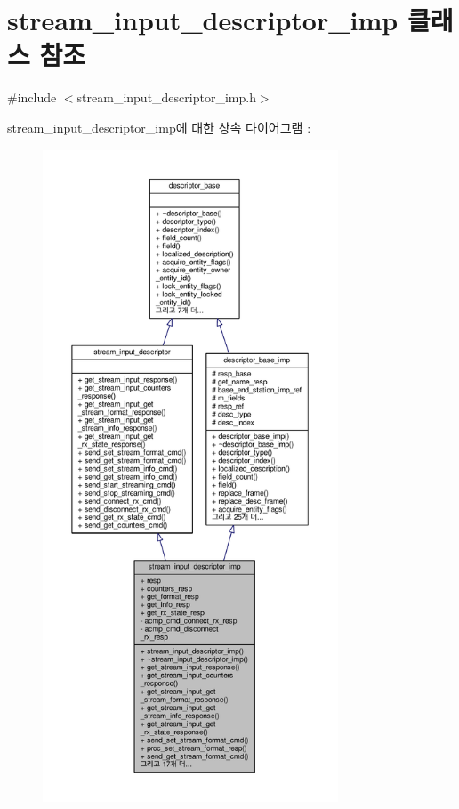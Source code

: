 \hypertarget{classavdecc__lib_1_1stream__input__descriptor__imp}{}\section{stream\+\_\+input\+\_\+descriptor\+\_\+imp 클래스 참조}
\label{classavdecc__lib_1_1stream__input__descriptor__imp}


{\ttfamily \#include $<$stream\+\_\+input\+\_\+descriptor\+\_\+imp.\+h$>$}



stream\+\_\+input\+\_\+descriptor\+\_\+imp에 대한 상속 다이어그램 \+: 
\nopagebreak
\begin{figure}[H]
\begin{center}
\leavevmode
\includegraphics[height=550pt]{classavdecc__lib_1_1stream__input__descriptor__imp__inherit__graph}
\end{center}
\end{figure}


